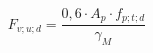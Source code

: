 \documentclass[12pt]{article}
\begin{document}
\begin{displaymath}
F_{v;u;d} = \frac {0,6 \cdot A_p \cdot f_{p;t;d}} {\gamma_M}
\end{displaymath}
\end{document}
